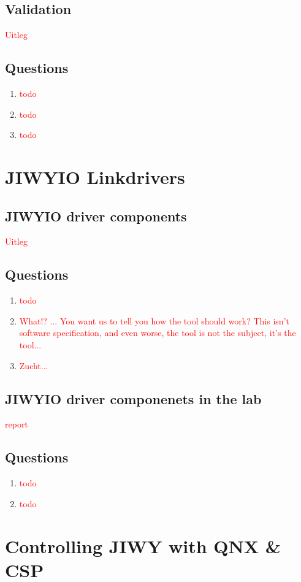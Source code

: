 \documentclass[a4paper,twoside,11pt]{article}
\newcommand{\todo}[1]{\textcolor{red}{#1}}
\begin{document}
\subsection{Validation}
\todo{Uitleg}

\subsection{Questions}
\begin{enumerate}
 \item \todo{todo}
 \item \todo{todo}
 \item \todo{todo}
\end{enumerate}

\section{JIWYIO Linkdrivers}
\subsection{JIWYIO driver components}
\todo{Uitleg}

\subsection{Questions}
\begin{enumerate}
 \item \todo{todo}
 \item \todo{What!? ... You want us to tell you how the tool should work? This isn't software specification, and even worse, the tool is not the subject, it's the tool...}
 \item \todo{Zucht...}
\end{enumerate}

\subsection{JIWYIO driver componenets in the lab}
\todo{report}

\subsection{Questions}
\begin{enumerate}
 \item \todo{todo}
 \item \todo{todo}
\end{enumerate}

\section{Controlling JIWY with QNX \& CSP}
\end{document}
